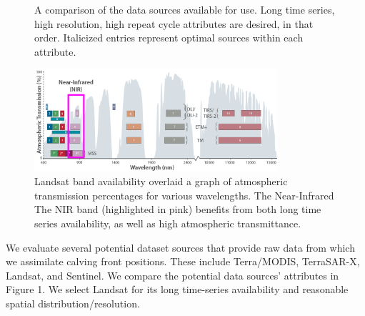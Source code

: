 \documentclass[tc, manuscript]{copernicus}
\begin{document}
\begin{figure}
\noindent
\begin{minipage}{9.0cm}
    \caption{A comparison of the data sources available for use. Long time series, high resolution, high repeat cycle attributes are desired, in that order. Italicized entries represent optimal sources within each attribute. }
    \label{tab:table-data_source}
\end{minipage}

\begin{minipage}{9.0cm}
    \includegraphics[width=9.0cm]{all_Landsat_bands_annotated.png}
    \caption{Landsat band availability overlaid a graph of atmospheric transmission percentages for various wavelengths. The Near-Infrared The NIR band (highlighted in pink) benefits from both long time series availability, as well as high atmospheric transmittance.}
\end{minipage}
\end{figure}

We evaluate several potential dataset sources that provide raw data from which we assimilate calving front positions. These include Terra/MODIS, TerraSAR-X, Landsat, and Sentinel. We compare the potential data sources' attributes in Figure 1. We select Landsat for its long time-series availability and reasonable spatial distribution/resolution.
\end{document}
